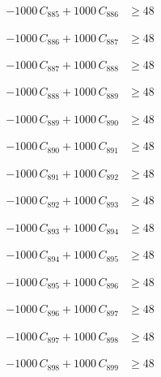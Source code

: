 \documentclass[a4paper,11pt]{article}
\begin{document}
\begin{align}
-1000\,C_{885} + 1000\,C_{886} &\geq 48 \nonumber
\end{align}

\begin{align}
-1000\,C_{886} + 1000\,C_{887} &\geq 48 \nonumber
\end{align}

\begin{align}
-1000\,C_{887} + 1000\,C_{888} &\geq 48 \nonumber
\end{align}

\begin{align}
-1000\,C_{888} + 1000\,C_{889} &\geq 48 \nonumber
\end{align}

\begin{align}
-1000\,C_{889} + 1000\,C_{890} &\geq 48 \nonumber
\end{align}

\begin{align}
-1000\,C_{890} + 1000\,C_{891} &\geq 48 \nonumber
\end{align}

\begin{align}
-1000\,C_{891} + 1000\,C_{892} &\geq 48 \nonumber
\end{align}

\begin{align}
-1000\,C_{892} + 1000\,C_{893} &\geq 48 \nonumber
\end{align}

\begin{align}
-1000\,C_{893} + 1000\,C_{894} &\geq 48 \nonumber
\end{align}

\begin{align}
-1000\,C_{894} + 1000\,C_{895} &\geq 48 \nonumber
\end{align}

\begin{align}
-1000\,C_{895} + 1000\,C_{896} &\geq 48 \nonumber
\end{align}

\begin{align}
-1000\,C_{896} + 1000\,C_{897} &\geq 48 \nonumber
\end{align}

\begin{align}
-1000\,C_{897} + 1000\,C_{898} &\geq 48 \nonumber
\end{align}

\begin{align}
-1000\,C_{898} + 1000\,C_{899} &\geq 48 \nonumber
\end{align}
\end{document}
